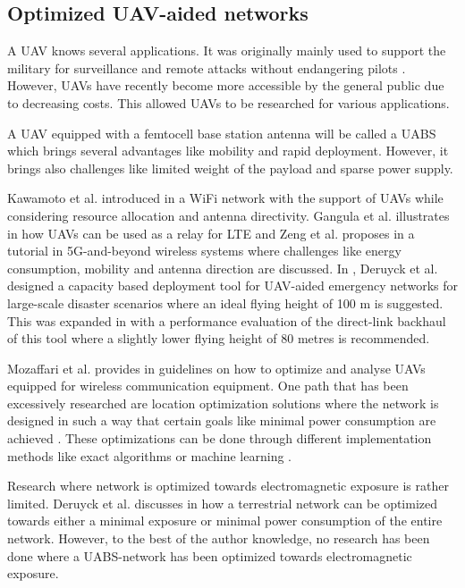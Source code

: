 \documentclass[twocolumn]{phdsymp} %
\begin{document}
\subsection{Optimized \gls{UAV}-aided networks}

A \gls{UAV} knows several applications. It was originally mainly used to support the military for surveillance and remote attacks without 
endangering pilots \cite{U12}. However, \gls{UAV}s have recently become more accessible by the general public due to decreasing costs. This 
allowed \gls{UAV}s to be researched for various applications.

A \gls{UAV} equipped with a femtocell base station antenna will be called a \gls{UABS}
which brings several advantages like mobility and rapid deployment. 
However, it brings also challenges like limited weight of the payload and sparse power supply.

Kawamoto et al. introduced in \cite{U11} a WiFi network with the support of  \gls{UAV}s while considering resource allocation 
and antenna directivity. 
Gangula et al. illustrates in \cite{U10} how \gls{UAV}s can be used as a relay for \gls{LTE}
and
Zeng et al. proposes in  \cite{U12} a tutorial in 5G-and-beyond wireless systems where challenges like 
energy consumption, mobility and antenna direction are discussed. 
In \cite{J2}, Deruyck et al. designed  a capacity based deployment tool for UAV-aided emergency
networks for large-scale disaster scenarios where an ideal flying height of 100 m is suggested. This was expanded 
in \cite{U1} with a performance evaluation of the direct-link backhaul of this tool where a slightly lower 
flying height of 80 metres is recommended.


Mozaffari et al. provides in \cite{U3} guidelines on how to optimize and analyse \gls{UAV}s equipped for 
wireless communication equipment.
One path that has been excessively researched are location optimization solutions where the network is 
designed in such a way that certain goals like minimal power consumption are achieved \cite{U6,U7,U8,U9}.
These optimizations can be done through different implementation methods like exact algorithms or machine learning \cite{U3,U5}.

Research where network is optimized towards electromagnetic exposure is rather limited.
Deruyck et al. discusses in \cite{J1} how a terrestrial network can be optimized towards either a minimal exposure or minimal power consumption of the entire network.
However, to the best of the author knowledge, no research has been done where a \gls{UABS}-network has been optimized towards electromagnetic exposure.
\end{document}

